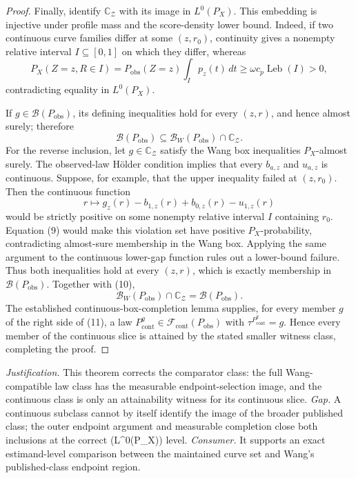 \documentclass{article}
\begin{document}
\begin{proof}
Finally, identify \(\mathbb C_{\mathcal Z}\) with its image in \(L^0(P_X)\).  This embedding is injective under profile mass and the score-density lower bound.  Indeed, if two continuous curve families differ at some \((z,r_0)\), continuity gives a nonempty relative interval \(I\subseteq[0,1]\) on which they differ, whereas
\[
P_X(Z=z,R\in I)
=P_{\mathrm{obs}}(Z=z)\int_I p_z(t)\,dt
\ge\omega c_p\operatorname{Leb}(I)>0,
\tag{9}
\]
contradicting equality in \(L^0(P_X)\).

If \(g\in\mathcal B(P_{\mathrm{obs}})\), its defining inequalities hold for every \((z,r)\), and hence almost surely; therefore
\[
\mathcal B(P_{\mathrm{obs}})
\subseteq\mathcal B_W(P_{\mathrm{obs}})\cap\mathbb C_{\mathcal Z}.
\tag{10}
\]
For the reverse inclusion, let \(g\in\mathbb C_{\mathcal Z}\) satisfy the Wang box inequalities \(P_X\)-almost surely.  The observed-law H\"older condition implies that every \(b_{a,z}\) and \(u_{a,z}\) is continuous.  Suppose, for example, that the upper inequality failed at \((z,r_0)\).  Then the continuous function
\[
r\longmapsto g_z(r)-b_{1,z}(r)+b_{0,z}(r)-u_{1,z}(r)
\]
would be strictly positive on some nonempty relative interval \(I\) containing \(r_0\).  Equation (9) would make this violation set have positive \(P_X\)-probability, contradicting almost-sure membership in the Wang box.  Applying the same argument to the continuous lower-gap function rules out a lower-bound failure.  Thus both inequalities hold at every \((z,r)\), which is exactly membership in \(\mathcal B(P_{\mathrm{obs}})\).  Together with (10),
\[
\mathcal B_W(P_{\mathrm{obs}})\cap\mathbb C_{\mathcal Z}
=\mathcal B(P_{\mathrm{obs}}).
\tag{11}
\]
The established continuous-box-completion lemma supplies, for every member \(g\) of the right side of (11), a law \(P^g_{\mathrm{cont}}\in\mathcal F_{\mathrm{cont}}(P_{\mathrm{obs}})\) with \(\tau^{P^g_{\mathrm{cont}}}=g\).  Hence every member of the continuous slice is attained by the stated smaller witness class, completing the proof.
\end{proof}
\par\smallskip\noindent \textit{Justification.} This theorem corrects the comparator class: the full Wang-compatible law class has the measurable endpoint-selection image, and the continuous class is only an attainability witness for its continuous slice. \textit{Gap.} A continuous subclass cannot by itself identify the image of the broader published class; the outer endpoint argument and measurable completion close both inclusions at the correct (L\textasciicircum{}0(P\_X)) level. \textit{Consumer.} It supports an exact estimand-level comparison between the maintained curve set and Wang's published-class endpoint region.
\end{document}
